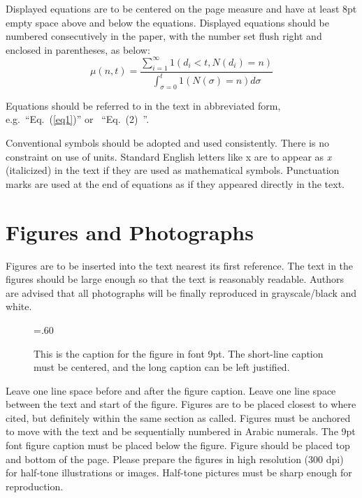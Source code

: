 \documentclass[twocolumn]{rps-esrel2026}
\begin{document}
Displayed equations are to be centered on the page measure and have
at least 8pt empty space above and below the equations.  Displayed
equations should be numbered consecutively in the paper, with the
number set flush right and enclosed in parentheses, as below:        
\begin{equation}\label{eq1}
\mu (n,t) = \frac{\sum\nolimits_{i = 1}^\infty {1\left( {d_i < t,N\left( 
{d_i } \right) = n} \right)} }{\int_{\sigma = 0}^t {1\left( {N(\sigma ) = n} 
\right)d\sigma } }
\end{equation} 
 
Equations should be referred to in the text in abbreviated form,
e.g.~``Eq.~(\ref{eq1})'' or \hbox{ ``Eq.~(2) ''.} %
\cite{sample4}

Conventional symbols should be adopted and used consistently. There
is no constraint on use of units.  Standard English letters like x
are to appear as \textit{x} (italicized) in the text if they are used as mathematical symbols. Punctuation marks are used at the end of equations as if they appeared directly in the text.\cite{sample5}



\section{Figures and Photographs}

Figures are to be inserted into the text nearest its first reference. The text in the figures should be large enough so that the text is reasonably readable.  
 Authors are advised that all photographs will be finally reproduced in grayscale/black and white.

\begin{figure}[b]
\epsfxsize=.60\hsize
\centerline{}
\caption{This is the caption for the figure in font 9pt. The short-line caption must be centered, and the long caption can be left justified.}
\label{fig1}
\end{figure}

Leave one line space before and after the figure caption. Leave one line space between the text and start of the figure.   Figures are to be placed closest to where
cited, but definitely within the same section as called.  Figures must be anchored to move with the text and be sequentially numbered in Arabic numerals.  The 9pt
font figure caption must be placed below the figure. \cite{sample6}
Figure should be placed top and bottom of the page. Please prepare the figures in high resolution (300 dpi) for
half-tone illustrations or images. Half-tone pictures must be sharp enough for reproduction.
\end{document}
